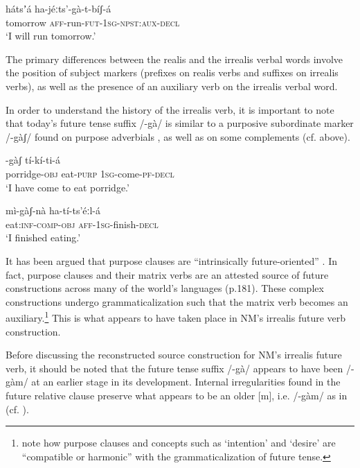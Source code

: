 \documentclass[output=paper]{langsci/langscibook}
\begin{document}
\ea\label{ex:mahland:74}
\gll hátsʼá    ha-jéːts'-gà-t-bíʃ-á     \\
tomorrow  \textsc{aff}{}-run-\textsc{fut-1sg-npst:aux-decl} \\
\glt `I will run tomorrow.'
\z

The primary differences between the realis and the irrealis verbal words involve the position of subject markers (prefixes on realis verbs and suffixes on irrealis verbs), as well as the presence of an auxiliary verb on the irrealis verbal word. 

In order to understand the history of the irrealis verb, it is important to note that today's future tense suffix /-gà/ is similar to a purposive subordinate marker /-gàʃ/ found on purpose adverbials , as well as on some complements  (cf.  above). 

\ea\label{ex:mahland:75}
\gll [kàːl-là     mí]-gàʃ  tí-kí-ti-á\\
  porridge-\textsc{obj}    eat-\textsc{purp}  \textsc{1sg}{}-come-\textsc{pf-decl} \\
  \glt `I have come to eat porridge.'
\z

\ea\label{ex:mahland:76}
\gll mì-gàʃ-nà             ha-tí-ts'éːl-{\downstep}á \\
  eat:\textsc{inf-comp-obj}  \textsc{aff-1sg-}finish-\textsc{decl}   \\
  \glt `I finished eating.'
\z

It has been argued that purpose clauses are “intrinsically future-oriented” \citep[43]{Schmidtke-Bode2009}. In fact, purpose clauses and their matrix verbs are an attested source of future constructions across many of the world's languages (p.181). These complex constructions undergo grammaticalization such that the matrix verb becomes an auxiliary.\footnote{\citet[263-75]{BybeeEtAl1994} note how purpose clauses and concepts such as `intention' and `desire' are “compatible or harmonic” with the grammaticalization of future tense.} This is what appears to have taken place in NM's irrealis future verb construction. 

Before discussing the reconstructed source construction for NM's irrealis future verb, it should be noted that the future tense suffix /-gà/ appears to have been /-gàm/ at an earlier stage in its development. Internal irregularities found in the future relative clause preserve what appears to be an older [m], i.e. /-gàm/ as in  (cf. \citealt[10]{Ahland2014b}).
\end{document}
